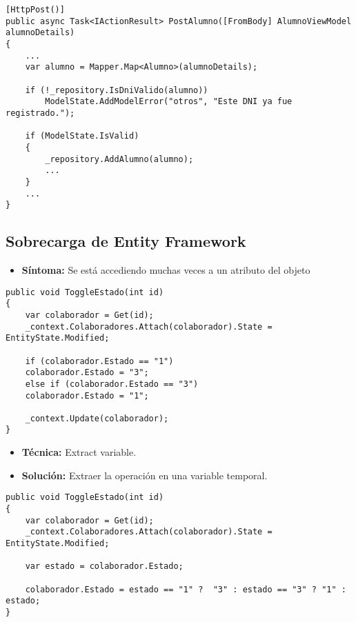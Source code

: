 \begin{lstlisting}[language={[Sharp]C}]
[HttpPost()]
public async Task<IActionResult> PostAlumno([FromBody] AlumnoViewModel alumnoDetails)
{
	...
	var alumno = Mapper.Map<Alumno>(alumnoDetails);

	if (!_repository.IsDniValido(alumno))
		ModelState.AddModelError("otros", "Este DNI ya fue registrado.");

	if (ModelState.IsValid)
	{
		_repository.AddAlumno(alumno);
		...
	}
	...
}
\end{lstlisting}
	

\subsection{Sobrecarga de Entity Framework}
\begin{itemize}
	\item \textbf{Síntoma:} Se está accediendo muchas veces a un atributo del objeto
\end{itemize}

\begin{lstlisting}[language={[Sharp]C}]
public void ToggleEstado(int id)
{
	var colaborador = Get(id);
	_context.Colaboradores.Attach(colaborador).State = EntityState.Modified;
	
	if (colaborador.Estado == "1")
	colaborador.Estado = "3";
	else if (colaborador.Estado == "3")
	colaborador.Estado = "1";
	
	_context.Update(colaborador);
}
\end{lstlisting}

\begin{itemize}	
	\item \textbf{Técnica:} Extract variable.
	\item \textbf{Solución:} Extraer la operación en una variable temporal.
\end{itemize}

\begin{lstlisting}[language={[Sharp]C}]
public void ToggleEstado(int id)
{
	var colaborador = Get(id);
	_context.Colaboradores.Attach(colaborador).State = EntityState.Modified;
	
	var estado = colaborador.Estado;
	
	colaborador.Estado = estado == "1" ?  "3" : estado == "3" ? "1" : estado;
}
\end{lstlisting}


